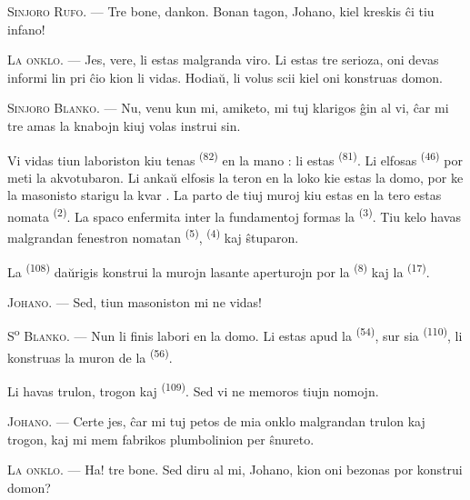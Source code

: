 \textsc{Sinjoro Rufo}. --- Tre bone, dankon. Bonan tagon, Johano, kiel kreskis
ĉi tiu infano!

\textsc{La onklo}. --- Jes, vere, li estas malgranda viro. Li estas tre
serioza, oni devas informi lin pri ĉio kion li vidas. Hodiaŭ, li volus scii
kiel oni konstruas domon.

\VUsaut{3.0mm}

\textsc{Sinjoro Blanko}. --- Nu, venu kun mi, amiketo, mi tuj klarigos ĝin al
vi, ĉar mi tre amas la knabojn kiuj volas instrui sin.

Vi vidas tiun laboriston kiu tenas  \textsuperscript{(82)} en
la mano : li estas  \textsuperscript{(81)}. Li elfosas
 \textsuperscript{(46)} por meti la akvotubaron. Li ankaŭ
elfosis la teron en la loko kie estas la domo, por ke la masonisto starigu la
kvar . La parto de tiuj muroj kiu estas en la tero estas
nomata  \textsuperscript{(2)}. La spaco enfermita inter la
fundamentoj formas la  \textsuperscript{(3)}. Tiu kelo havas
malgrandan fenestron nomatan  \textsuperscript{(5)},
 \textsuperscript{(4)} kaj ŝtuparon.

La  \textsuperscript{(108)} daŭrigis konstrui la murojn
lasante aperturojn por la  \textsuperscript{(8)} kaj la
 \textsuperscript{(17)}.

\textsc{Johano}. --- Sed, tiun masoniston mi ne vidas!

S\textsuperscript{o} \textsc{Blanko}. --- Nun li finis labori en la domo. Li
estas apud la  \textsuperscript{(54)}, sur sia
 \textsuperscript{(110)}, li konstruas la muron de la
 \textsuperscript{(56)}.

Li havas trulon, trogon kaj  \textsuperscript{(109)}. Sed
vi ne memoros tiujn nomojn.

\textsc{Johano}. --- Certe jes, ĉar mi tuj petos de mia onklo malgrandan
trulon kaj trogon, kaj mi mem fabrikos plumbolinion per ŝnureto.

\VUsaut{3.0mm}
\VUsaut{3.0mm}

\textsc{La onklo}. --- Ha! tre bone. Sed diru al mi, Johano, kion oni bezonas
por konstrui domon?

